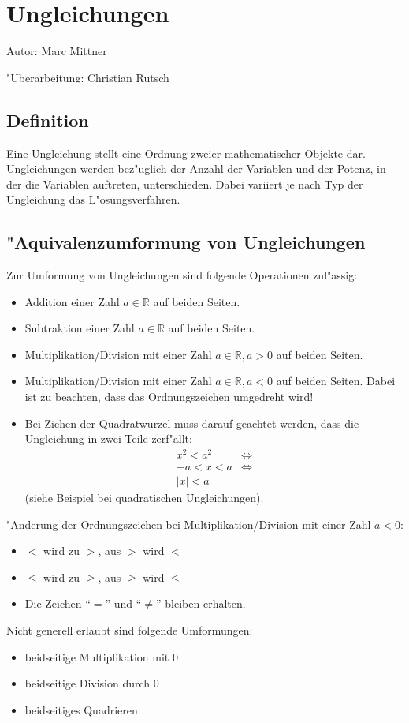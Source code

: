 \section{Ungleichungen}

Autor: Marc Mittner

\noindent "Uberarbeitung: Christian Rutsch

\subsection{Definition}
Eine Ungleichung stellt eine Ordnung zweier mathematischer Objekte dar. Ungleichungen werden bez"uglich der Anzahl der Variablen und der Potenz, in der die Variablen auftreten, unterschieden. Dabei variiert je nach Typ der Ungleichung das L"osungsverfahren.

\subsection{"Aquivalenzumformung von Ungleichungen}
Zur Umformung von Ungleichungen sind folgende Operationen zul"assig:
\begin{itemize}
\item{Addition einer Zahl $a \in \mathbb{R}$ auf beiden Seiten.}
\item{Subtraktion einer Zahl $a \in \mathbb{R}$ auf beiden Seiten.}
\item{Multiplikation/Division mit einer Zahl $a \in \mathbb{R}, a > 0$ auf beiden Seiten.}
\item{Multiplikation/Division mit einer Zahl $a \in \mathbb{R}, a < 0 $ auf beiden Seiten. Dabei ist zu beachten, dass das Ordnungszeichen umgedreht wird!}
\item{Bei Ziehen der Quadratwurzel muss darauf geachtet werden, dass die Ungleichung in zwei Teile zerf"allt:
\begin{align*}
x^2 < a^2 &\Leftrightarrow \\
-a < x < a &\Leftrightarrow \\
 |x| < a &
\end{align*}
(siehe Beispiel bei quadratischen Ungleichungen).}
\end{itemize}
"Anderung der Ordnungszeichen bei Multiplikation/Division mit einer Zahl $ a < 0 $:
\begin{itemize}
\item $ < $ wird zu $ > $, aus $ > $ wird $ < $
\item $ \leq $ wird zu $ \geq $, aus $ \geq $ wird $ \leq $
\item Die Zeichen "`$ = $"' und "`$ \neq $"' bleiben erhalten.
\end{itemize}
Nicht generell erlaubt sind folgende Umformungen:
\begin{itemize}
\item beidseitige Multiplikation mit 0
\item beidseitige Division durch 0
\item beidseitiges Quadrieren 
\end{itemize}


